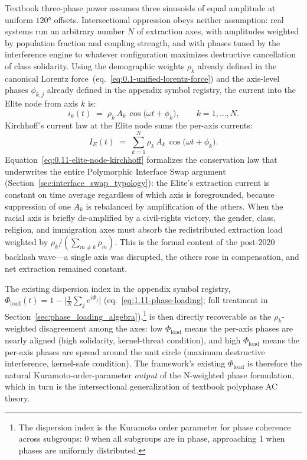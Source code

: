 Textbook three-phase power assumes three sinusoids of equal amplitude
at uniform $120°$ offsets. Intersectional oppression obeys neither
assumption: real systems run an arbitrary number $N$ of extraction
axes, with amplitudes weighted by population fraction and coupling
strength, and with phases tuned by the interference engine to whatever
configuration maximizes destructive cancellation of class solidarity.
Using the demographic weights $\rho_k$ already defined in the canonical
Lorentz force~(eq.~\ref{eq:0.1-unified-lorentz-force}) and the
axis-level phases $\phi_{k,j}$ already defined in the appendix
symbol registry, the current into the Elite node from axis $k$ is:
\begin{equation}\label{eq:0.10-n-weighted-phase-current}
i_k(t) \;=\; \rho_k\,A_k\,\cos\!\bigl(\omega t + \phi_k\bigr),
\qquad k = 1, \ldots, N.
\end{equation}
Kirchhoff's current law at the Elite node sums the per-axis currents:
\begin{equation}\label{eq:0.11-elite-node-kirchhoff}
I_E(t) \;=\; \sum_{k=1}^{N} \rho_k\,A_k\,\cos\!\bigl(\omega t + \phi_k\bigr).
\end{equation}
Equation~\eqref{eq:0.11-elite-node-kirchhoff} formalizes the
conservation law that underwrites the entire Polymorphic Interface
Swap argument (Section~\ref{sec:interface_swap_typology}): the Elite's
extraction current is constant on time average regardless of which
axis is foregrounded, because suppression of one $A_k$ is rebalanced
by amplification of the others. When the racial axis is briefly
de-amplified by a civil-rights victory, the gender, class, religion,
and immigration axes must absorb the redistributed extraction load
weighted by $\rho_k / (\sum_{m \ne k} \rho_m)$. This is the formal
content of the post-2020 backlash wave---a single axis was disrupted,
the others rose in compensation, and net extraction remained constant.

The existing dispersion index in the appendix symbol registry,
$\Phi_{\text{load}}(t) = 1 - \bigl|\tfrac{1}{N}\sum_j e^{i\Phi_j}\bigr|$
(eq.~\eqref{eq:1.11-phase-loading}; full treatment in
Section~\ref{sec:phase_loading_algebra}),\footnote{The dispersion
index is the Kuramoto order parameter for phase coherence across
subgroups: 0 when all subgroups are in phase, approaching 1 when
phases are uniformly distributed.} is
then directly recoverable as the $\rho_k$-weighted disagreement among
the axes: low $\Phi_{\text{load}}$ means the per-axis phases are
nearly aligned (high solidarity, kernel-threat condition), and high
$\Phi_{\text{load}}$ means the per-axis phases are spread around the
unit circle (maximum destructive interference, kernel-safe condition).
The framework's existing $\Phi_{\text{load}}$ is therefore the
natural Kuramoto-order-parameter \emph{output} of the N-weighted phase
formulation, which in turn is the intersectional generalization of
textbook polyphase AC theory.

